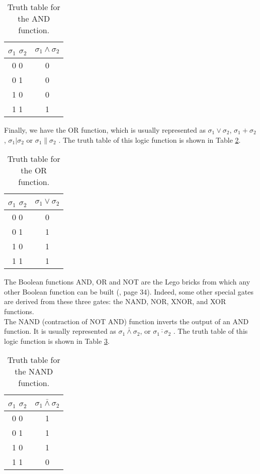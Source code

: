 \begin{table}[h]
\centering
\begin{tabular}{ |c||c| } 
 \hline
 $\sigma_{1}$	$\sigma_{2}$ & $\sigma_{1} \wedge \sigma_{2}$ \\ 
 \hline
 \hline
 0	0 & 0\\ 
 \hline
 0	1 & 0\\
 \hline
 1	0 & 0\\
 \hline
 1	1 & 1\\
 \hline
\end{tabular}
 \caption{Truth table for the AND function.}
 \label{tab:and_table}
\end{table}

Finally, we have the OR function, which is usually represented as $\sigma_{1} \vee \sigma_{2}$, $\sigma_{1} + \sigma_{2}$, $\sigma_{1} | \sigma_{2}$ or $\sigma_{1} \parallel \sigma_{2}$ \cite{gates}. The truth table of this logic function is shown in Table \ref{tab:or_table}.\\

\begin{table}[h]
\centering
\begin{tabular}{ |c||c| } 
 \hline
 $\sigma_{1}$	$\sigma_{2}$ & $\sigma_{1} \vee \sigma_{2}$ \\ 
 \hline
 \hline
 0	0 & 0\\ 
 \hline
 0	1 & 1\\
 \hline
 1	0 & 1\\
 \hline
 1	1 & 1\\
 \hline
\end{tabular}
 \caption{Truth table for the OR function.}
 \label{tab:or_table}
\end{table}

The Boolean functions AND, OR and NOT are the Lego bricks from which any other Boolean function can be built (\cite{digital}, page 34). Indeed, some other special gates are derived from these three gates: the NAND, NOR, XNOR, and XOR functions.\\

The NAND (contraction of NOT AND) function inverts the output of an AND function. It is usually represented as $\sigma_{1} \bar{\wedge} \sigma_{2}$, or $\overline{\sigma_{1} \cdot \sigma_{2}} $ \cite{gates}. The truth table of this logic function is shown in Table \ref{tab:nand_table}.

\begin{table}[h]
\centering
\begin{tabular}{ |c||c| } 
 \hline
 $\sigma_{1}$	$\sigma_{2}$ & $\sigma_{1} \bar{\wedge} \sigma_{2}$ \\ 
 \hline
 \hline
 0	0 & 1\\ 
 \hline
 0	1 & 1\\
 \hline
 1	0 & 1\\
 \hline
 1	1 & 0\\
 \hline
\end{tabular}
 \caption{Truth table for the NAND function.}
 \label{tab:nand_table}
\end{table}

